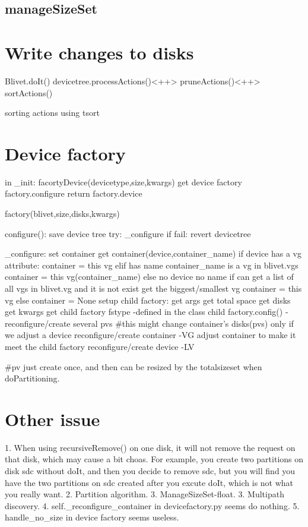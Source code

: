 \documentclass{article}
\begin{document}
\subsection{manageSizeSet}


\section{Write changes to disks}
Blivet.doIt()
devicetree.processActions()<++>
pruneActions()<++>
sortActions()

sorting actions using tsort

\section{Device factory}

in _init:
facortyDevice(devicetype,size,kwargs)
  get device factory
  factory.configure
return factory.device

factory(blivet,size,disks,kwargs)

configure():
save device tree
try: _configure
if fail: revert devicetree

_configure:
set container
  get container(device,container_name)
     if device has a vg attribute:
          container = this vg
     elif has name
        container_name is a vg in blivet.vgs
          container = this vg(container_name)
     else no device no name
        if can get a list of all vgs in blivet.vg and it is not exist
        get the biggest/smallest vg
        container = this vg
        else
          container = None
setup child factory:
  get args
    get total space
    get disks
  get kwargs
	get child factory fstype -defined in the class
child factory.config() -reconfigure/create several pvs
  #this might change container's disks(pvs) only if we adjust a device
reconfigure/create container  -VG
    adjust container to make it meet the child factory
reconfigure/create device  -LV

#pv just create once, and then can be resized by the totalsizeset when
doPartitioning.


\section{Other issue}
1. When using recursiveRemove() on one disk, it will not remove the request on
that disk, which may cause a bit choas. For example, you create two partitions
on disk sdc without doIt, and then you decide to remove sdc, but you will find
you have the two partitions on sdc created after you excute doIt, which is not
what you really want.
2. Partition algorithm.
3. ManageSizeSet-float.
3. Multipath discovery.
4. self._reconfigure_container in devicefactory.py seems do nothing.
5. handle_no_size in device factory seems useless.
\end{document}
